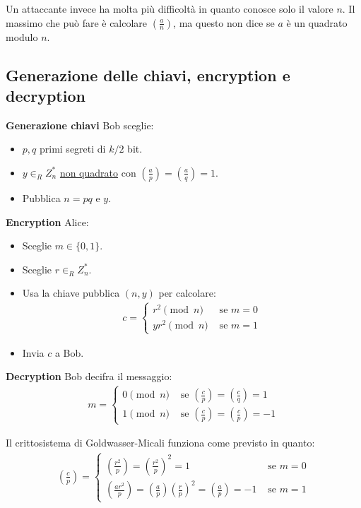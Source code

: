 \noindent Un attaccante invece ha molta più difficoltà in quanto conosce solo il valore $n$. Il massimo che può fare è calcolare $\left(\frac{a}{n}\right)$, ma questo non dice se $a$ è un quadrato modulo $n$.

\subsection{Generazione delle chiavi, encryption e decryption}

\textbf{Generazione chiavi}
\noindent Bob sceglie:
\begin{itemize}
    \item $p, q$ primi segreti  di $k/2$ bit.
    \item $y \in_R Z_n^*$ \underline{non quadrato} con $(\frac{a}{p}) = (\frac{a}{q}) = 1$.
    \item Pubblica $n = pq$ e $y$.
\end{itemize}

\noindent \textbf{Encryption}
\noindent Alice:
\begin{itemize}
    \item Sceglie $m \in \{0, 1\}$.
    \item Sceglie $r \in_R Z_n^*$.
    \item Usa la chiave pubblica $(n, y)$ per calcolare:
    \begin{align*}
        c = \begin{cases}
                r^2 \pmod n & \text{ se } m=0\\
                yr^2 \pmod n & \text{ se } m=1
        \end{cases}
    \end{align*}
    \item Invia $c$ a Bob.
\end{itemize}

\noindent \textbf{Decryption}
\noindent Bob decifra il messaggio:
\begin{align*}
    m = \begin{cases}
                0 \pmod n & \text{ se } \left(\frac{c}{p} \right) = \left(\frac{c}{q} \right) = 1\\
                1 \pmod n & \text{ se } \left(\frac{c}{p} \right) = \left(\frac{c}{p} \right) = -1
        \end{cases}
\end{align*}

\noindent Il crittosistema di Goldwasser-Micali funziona come previsto in quanto:
\begin{align*}
    \left(\frac{c}{p} \right) = 
        \begin{cases}
                \left(\frac{r^2}{p} \right) = \left(\frac{r^2}{p} \right)^2 = 1 & \text{ se } m = 0\\
                \left(\frac{ar^2}{p} \right) = \left(\frac{a}{p} \right)\left(\frac{r}{p} \right)^2 = \left(\frac{a}{p} \right) = -1 & \text{ se } m = 1
        \end{cases}
\end{align*}

